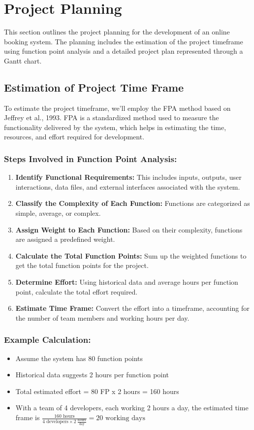 \chapter{Project Planning}
\label{ch:project-planning}
This section outlines the project planning for the development of an online booking system. The planning includes the estimation of the project timeframe using function point analysis and a detailed project plan represented through a Gantt chart.

\section{Estimation of Project Time Frame}
\label{sec:estimation-of-project-time-frame}
To estimate the project timeframe, we'll employ the \ac{FPA} method based on Jeffrey et al., 1993. \ac{FPA} is a standardized method used to measure the functionality delivered by the system, which helps in estimating the time, resources, and effort required for development.

\subsection*{Steps Involved in Function Point Analysis:}
\begin{enumerate}
    \item \textbf{Identify Functional Requirements:} This includes inputs, outputs, user interactions, data files, and external interfaces associated with the system.
    \item \textbf{Classify the Complexity of Each Function:} Functions are categorized as simple, average, or complex.
    \item \textbf{Assign Weight to Each Function:} Based on their complexity, functions are assigned a predefined weight.
    \item \textbf{Calculate the Total Function Points:} Sum up the weighted functions to get the total function points for the project.
    \item \textbf{Determine Effort:} Using historical data and average hours per function point, calculate the total effort required.
    \item \textbf{Estimate Time Frame:} Convert the effort into a timeframe, accounting for the number of team members and working hours per day.
\end{enumerate}

\subsection*{Example Calculation:}
\begin{itemize}
    \item Assume the system has 80 function points
    \item Historical data suggests 2 hours per function point
    \item Total estimated effort = 80 FP x 2 hours = 160 hours
    \item With a team of 4 developers, each working 2 hours a day, the estimated time frame is $\frac{160 \text{ hours}}{4 \text{ developers} \times 2\ \frac{\text{hours}}{\text{day}}} = 20 \text{ working days}$
\end{itemize}

